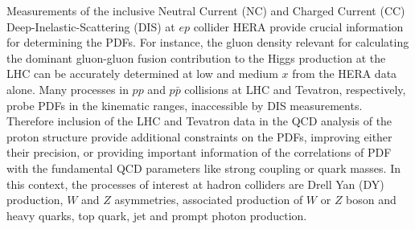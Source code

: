 Measurements of the inclusive Neutral Current (NC) and Charged Current (CC)  
Deep-Inelastic-Scattering (DIS) at $ep$ collider HERA provide crucial information for determining the PDFs.
%
For instance, the gluon density relevant
for calculating the dominant gluon-gluon fusion contribution to the Higgs production
at the LHC can be accurately determined at low and medium $x$ from the HERA data alone.
%
Many processes in $pp$ and $p \bar p$ collisions at LHC and Tevatron, respectively, 
probe PDFs in the kinematic ranges, inaccessible by DIS measurements. 
Therefore inclusion of the LHC and Tevatron data in the QCD analysis of the proton structure 
provide additional constraints on the PDFs, improving either their precision, 
or providing important information of the correlations of PDF with the fundamental 
QCD parameters like strong coupling or quark masses. 
%
%
In this context, the processes of interest at hadron colliders are
Drell Yan (DY) production, $W$ and $Z$ asymmetries, associated production of $W$ or $Z$ boson 
and heavy quarks, top quark, jet and prompt photon production.
%

